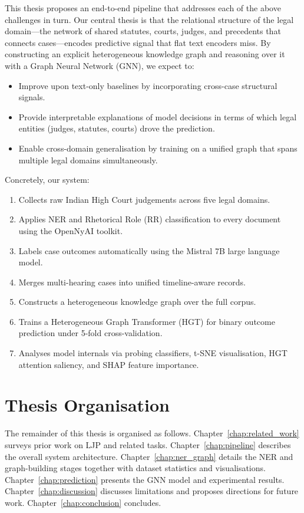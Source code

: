 \documentclass[12pt,a4paper]{report}
\begin{document}
This thesis proposes an end-to-end pipeline that addresses each of the above challenges in turn. Our central thesis is that the relational structure of the legal domain---the network of shared statutes, courts, judges, and precedents that connects cases---encodes predictive signal that flat text encoders miss. By constructing an explicit heterogeneous knowledge graph and reasoning over it with a Graph Neural Network (GNN), we expect to:

\begin{itemize}
  \item Improve upon text-only baselines by incorporating cross-case structural signals.
  \item Provide interpretable explanations of model decisions in terms of which legal entities (judges, statutes, courts) drove the prediction.
  \item Enable cross-domain generalisation by training on a unified graph that spans multiple legal domains simultaneously.
\end{itemize}

Concretely, our system:

\begin{enumerate}
  \item Collects raw Indian High Court judgements across five legal domains.
  \item Applies NER and Rhetorical Role (RR) classification to every document using the OpenNyAI toolkit.
  \item Labels case outcomes automatically using the Mistral 7B large language model.
  \item Merges multi-hearing cases into unified timeline-aware records.
  \item Constructs a heterogeneous knowledge graph over the full corpus.
  \item Trains a Heterogeneous Graph Transformer (HGT) for binary outcome prediction under 5-fold cross-validation.
  \item Analyses model internals via probing classifiers, t-SNE visualisation, HGT attention saliency, and SHAP feature importance.
\end{enumerate}

\section{Thesis Organisation}
\label{sec:organisation}

The remainder of this thesis is organised as follows. Chapter~\ref{chap:related_work} surveys prior work on LJP and related tasks. Chapter~\ref{chap:pipeline} describes the overall system architecture. Chapter~\ref{chap:ner_graph} details the NER and graph-building stages together with dataset statistics and visualisations. Chapter~\ref{chap:prediction} presents the GNN model and experimental results. Chapter~\ref{chap:discussion} discusses limitations and proposes directions for future work. Chapter~\ref{chap:conclusion} concludes.
\end{document}
